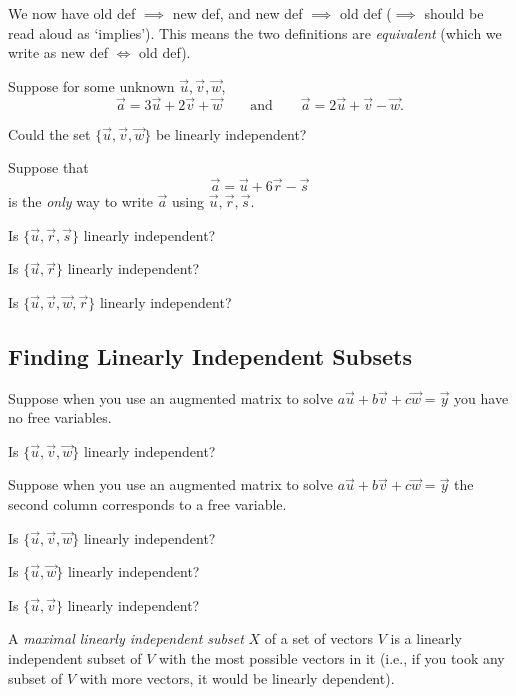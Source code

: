 \documentclass[letter]{article}
\begin{document}
	We now have old def $\implies$ new def, and new def $\implies$ old def ($\implies$
	should be read aloud as `implies').  This means the two definitions
	are \emph{equivalent} (which we write as new def $\iff$ old def).


	Suppose for some unknown $\vec u,\vec v,\vec w$,
	\[
		\vec a = 3\vec u+2\vec v +\vec w\qquad \text{and}\qquad 
		\vec a = 2\vec u+\vec v -\vec w.
	\]
	\begin{Enum}
		\item Could the set $\{\vec u,\vec v,\vec w\}$ be linearly
		independent?
	\end{Enum}
	Suppose that
	\[
		\vec a = \vec u+6\vec r-\vec s
	\]
	is the \emph{only} way to write $\vec a$ using $\vec u,\vec r,\vec s$.
	\begin{Enum}[resume]
		\item Is $\{\vec u,\vec r,\vec s\}$ linearly independent?
		\item Is $\{\vec u,\vec r\}$ linearly independent?
		\item Is $\{\vec u,\vec v,\vec w,\vec r\}$ linearly independent?
	\end{Enum}

\subsection*{Finding Linearly Independent Subsets}
	Suppose when you use an augmented matrix to solve
	$a\vec u+b\vec v+c\vec w=\vec y$ you have no free variables.
	
	\begin{Enum}
		\item Is $\{\vec u,\vec v,\vec w\}$ linearly independent?
	\end{Enum}
	
	Suppose when you use an augmented matrix to solve
	$a\vec u+b\vec v+c\vec w=\vec y$ the second column corresponds to a 
	free variable.
	
	\begin{Enum}[resume]
		\item Is $\{\vec u,\vec v,\vec w\}$ linearly independent?
		\item Is $\{\vec u,\vec w\}$ linearly independent?
		\item Is $\{\vec u,\vec v\}$ linearly independent?
	\end{Enum}

	A \emph{maximal linearly independent subset} $X$ of a set of vectors $V$
	is a linearly independent subset of $V$ with the most possible vectors in it 
	(i.e., if you took any subset of $V$ with more vectors, it would be linearly
	dependent).
\end{document}
